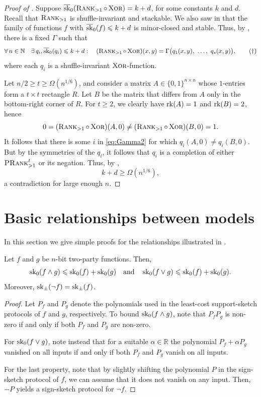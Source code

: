 \documentclass{article}
\begin{document}
\begin{proof}[Proof of ]
    Suppose $\operatorname{\overline{sk}}_0(\operatorname{\textsc{Rank}}_{>1}\circ\operatorname{\textsc{Xor}}) = k + d$, for some constants $k$ and $d$.
    Recall that   $\operatorname{\textsc{Rank}}_{>1}$ is shuffle-invariant and stackable. We also saw in  that the family of functions $f$ with $\operatorname{\overline{sk}}_0(f) \leqslant k + d$ is minor-closed and stable. Thus, by , there is a fixed $\Gamma$ such that
    \[
        \forall\, n\in\mathbb{N}\quad \exists\, q_i, \csk_0(q_i) \leq k + d:\quad
        (\Rank_{>1}\circ \xor)(x,y) = \Gamma\big(q_1(x,y),\ \dots,\ q_s(x,y)\big),\tag{$\dagger$}\label{eq:Gamma2}
    \]
    where each $q_i$ is a shuffle-invariant $\operatorname{\textsc{Xor}}$-function.

    \medskip

    Let $n/2 \geq t \geq \Omega(n^{1/6})$, and consider a matrix $A\in\{0,1\}^{n\times n}$ whose $1$-entries form a $t\times t$ rectangle $R$. Let $B$ be the matrix that differs from $A$ only in the bottom-right corner of $R$. For $t\geq 2$, we clearly have $\operatorname{rk}(A) = 1$ and $\operatorname{rk}(B) = 2$, hence
    \[
        0 = (\operatorname{\textsc{Rank}}_{>1}\circ \operatorname{\textsc{Xor}})(A,0) \neq (\operatorname{\textsc{Rank}}_{>1}\circ \operatorname{\textsc{Xor}})(B,0) = 1.
    \]
    It follows that there is some $i$ in \cref{eq:Gamma2} for which $q_i(A,0) \neq q_i(B,0)$. But by the symmetries of the $q_i$, it follows that $q_i$ is a completion of either $\operatorname{\textsc{PRank}}^t_{>1}$ or its negation. Thus, by ,
    \[
        k+d\geq \Omega(n^{1/6}),
    \]
    a contradiction for large enough $n$.
\end{proof}


\section{Basic relationships between models} \label{sec:prelim}

In this section we give simple proofs for the relationships illustrated in .

\begin{boxproposition}
    Let $f$ and $g$ be $n$-bit two-party functions. Then,
    \[ 
        \operatorname{sk}_0(f\wedge g) \leqslant \operatorname{sk}_0(f)+\operatorname{sk}_0(g) \quad\text{and}\quad
        \operatorname{sk}_0(f\vee g) \leqslant  \operatorname{sk}_0(f)+\operatorname{sk}_0(g).
    \]
    Moreover, $\operatorname{sk}_\pm(\neg f) = \operatorname{sk}_\pm(f)$.
\end{boxproposition}

\begin{proof}
    Let $P_f$ and $P_g$ denote the polynomials used in the least-cost support-sketch protocols of $f$ and $g$, respectively. To bound $\operatorname{sk}_0(f\wedge g)$, note that $P_fP_g$ is non-zero if and only if both $P_f$ and $P_g$ are non-zero.
    
    For $\operatorname{sk}_0(f\vee g)$, note instead that for a suitable $\alpha\in\mathbb{R}$ the polynomial $P_f+\alpha P_g$ vanished on all inputs if and only if both $P_f$ and $P_g$ vanish on all inputs.
    
    For the last property, note that by slightly shifting the polynomial $P$ in the sign-sketch protocol of $f$, we can assume that it does not vanish on any input. Then, $-P$ yields a sign-sketch protocol for $\neg f$.
\end{proof}
\end{document}
